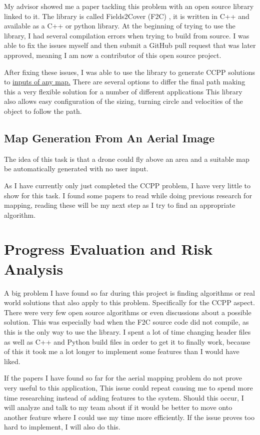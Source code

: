 \documentclass[progress]{cmpreport}
\begin{document}
My advisor showed me a paper tackling this problem with an open source library linked to it.
The library is called Fields2Cover (F2C) \cite{fields2cover2023github}, it is written in C++ and available as a C++ or python library.
At the beginning of trying to use the library, I had several compilation errors when trying to build from source.
I was able to fix the issues myself and then submit a GitHub pull request that was later approved, meaning I am now a contributor of this open source project.

After fixing these issues, I was able to use the library to generate CCPP solutions to \hyperref[F2CCCPP]{inputs of any map.}
There are several options to differ the final path making this a very flexible solution for a number of different applications
This library also allows easy configuration of the sizing, turning circle and velocities of the object to follow the path.

\subsection{Map Generation From An Aerial Image}
The idea of this task is that a drone could fly above an area and a suitable map be automatically generated with no user input.

As I have currently only just completed the CCPP problem, I have very little to show for this task.
I found some papers to read while doing previous research for mapping, reading these will be my next step as I try to find an appropriate algorithm.

\section{Progress Evaluation and Risk Analysis}
A big problem I have found so far during this project is finding algorithms or real world solutions that also apply to this problem.
Specifically for the CCPP aspect. There were very few open source algorithms or even discussions about a possible solution.
This was especially bad when the F2C source code did not compile, as this is the only way to use the library.
I spent a lot of time changing header files as well as C++ and Python build files in order to get it to finally work,
because of this it took me a lot longer to implement some features than I would have liked.

If the papers I have found so far for the aerial mapping problem do not prove very useful to this application,
This issue could repeat causing me to spend more time researching instead of adding features to the system.
Should this occur, I will analyze and talk to my team about if it would be better to move onto another feature where I could use my time more efficiently.
If the issue proves too hard to implement, I will also do this.
\end{document}
